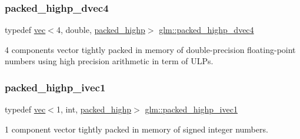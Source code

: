 \mbox{\label{group__gtc__type__aligned_ga7eb6a2440202876a3a223a1931dd496a}} 
\subsubsection{\texorpdfstring{packed\+\_\+highp\+\_\+dvec4}{packed\_highp\_dvec4}}
{\footnotesize\ttfamily typedef \mbox{\hyperlink{structglm_1_1vec}{vec}}$<$4, double, \mbox{\hyperlink{namespaceglm_a36ed105b07c7746804d7fdc7cc90ff25a8e8791ee77fe079b1291f710d88031bf}{packed\+\_\+highp}}$>$ \mbox{\hyperlink{group__gtc__type__aligned_ga7eb6a2440202876a3a223a1931dd496a}{glm\+::packed\+\_\+highp\+\_\+dvec4}}}



4 components vector tightly packed in memory of double-\/precision floating-\/point numbers using high precision arithmetic in term of U\+L\+Ps. 

\mbox{\label{group__gtc__type__aligned_ga7fde67656fb5726169114054992f0a3f}} 
\subsubsection{\texorpdfstring{packed\+\_\+highp\+\_\+ivec1}{packed\_highp\_ivec1}}
{\footnotesize\ttfamily typedef \mbox{\hyperlink{structglm_1_1vec}{vec}}$<$1, int, \mbox{\hyperlink{namespaceglm_a36ed105b07c7746804d7fdc7cc90ff25a8e8791ee77fe079b1291f710d88031bf}{packed\+\_\+highp}}$>$ \mbox{\hyperlink{group__gtc__type__aligned_ga7fde67656fb5726169114054992f0a3f}{glm\+::packed\+\_\+highp\+\_\+ivec1}}}



1 component vector tightly packed in memory of signed integer numbers. 

\mbox{\label{group__gtc__type__aligned_gae362d70a8be88cc43b6c1ec0992e73db}} 

